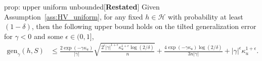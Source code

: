 \documentclass{article}
\theoremstyle{plain}
\theoremstyle{plain}
\theoremstyle{definition}
\theoremstyle{remark}
\newcommand{\RTrue}{\mathrm{R}}
\newcommand{\RTET}{\mathrm{R}_{\gamma}}
\begin{document}
\begin{tcolorbox}

    \begin{repproposition}{prop: upper uniform unbounded}[\textbf{Restated}]
         Given Assumption~\ref{ass:HV_uniform}, for any fixed $h\in\mathcal{H}$ with probability at least $(1-\delta)$, then the following upper bound holds on the tilted generalization error for $\gamma<0$ and some $\epsilon\in(0,1]$,
    \begin{equation}
    \begin{split}
      \mathrm{gen}_{\gamma}(h,S)&\leq \frac{2\exp(-\gamma \kappa_u)}{|\gamma|}\sqrt{\frac{2^{\epsilon}|\gamma|^{1+\epsilon}\kappa_u^{1+\epsilon}\log(2/\delta)}{n}}+\frac{4\exp(-\gamma \kappa_u)\log(2/\delta)}{3n|\gamma|}+|\gamma|^\epsilon\kappa_u^{1+\epsilon}.
      \end{split}
    \end{equation}         
\end{repproposition}
\end{tcolorbox}
\end{document}
